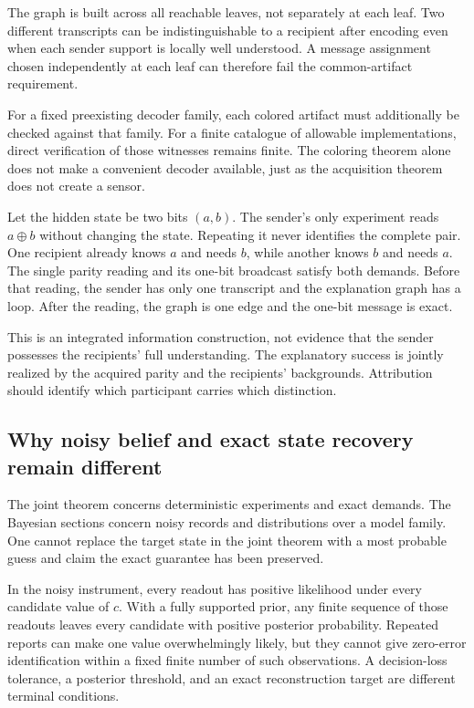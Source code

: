 The graph is built across all reachable leaves, not separately at each leaf. Two different transcripts can be indistinguishable to a recipient after encoding even when each sender support is locally well understood. A message assignment chosen independently at each leaf can therefore fail the common-artifact requirement.

For a fixed preexisting decoder family, each colored artifact must additionally be checked against that family. For a finite catalogue of allowable implementations, direct verification of those witnesses remains finite. The coloring theorem alone does not make a convenient decoder available, just as the acquisition theorem does not create a sensor.

\begin{MUcounterexample}\label{MU:ex:joint-source}
Let the hidden state be two bits $(a,b)$. The sender's only experiment reads $a\oplus b$ without changing the state. Repeating it never identifies the complete pair. One recipient already knows $a$ and needs $b$, while another knows $b$ and needs $a$. The single parity reading and its one-bit broadcast satisfy both demands. Before that reading, the sender has only one transcript and the explanation graph has a loop. After the reading, the graph is one edge and the one-bit message is exact.
\end{MUcounterexample}

This is an integrated information construction, not evidence that the sender possesses the recipients' full understanding. The explanatory success is jointly realized by the acquired parity and the recipients' backgrounds. Attribution should identify which participant carries which distinction.

\subsection{Why noisy belief and exact state recovery remain different}
The joint theorem concerns deterministic experiments and exact demands. The Bayesian sections concern noisy records and distributions over a model family. One cannot replace the target state in the joint theorem with a most probable guess and claim the exact guarantee has been preserved.

In the noisy instrument, every readout has positive likelihood under every candidate value of $c$. With a fully supported prior, any finite sequence of those readouts leaves every candidate with positive posterior probability. Repeated reports can make one value overwhelmingly likely, but they cannot give zero-error identification within a fixed finite number of such observations. A decision-loss tolerance, a posterior threshold, and an exact reconstruction target are different terminal conditions.

